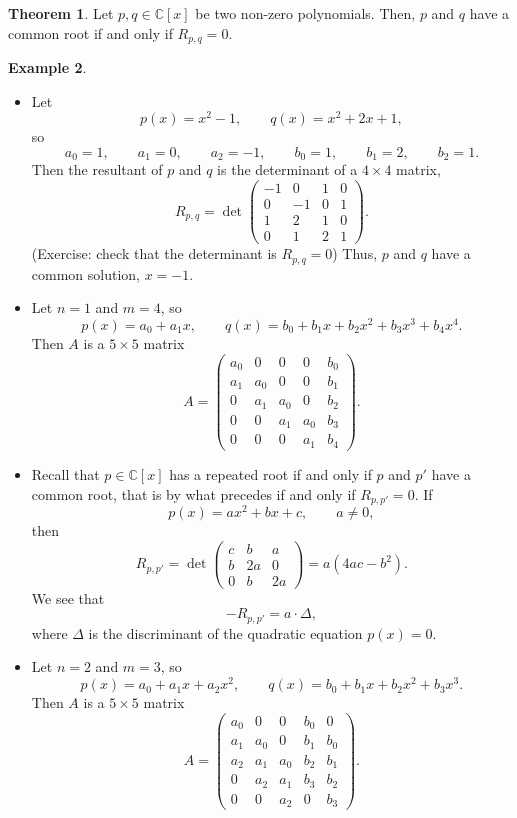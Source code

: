 \documentclass{article}
\newcommand{\C}{\mathbb{C}}
\newcommand{\rb}[1]{\left( #1 \right)}
\renewcommand{\sb}[1]{\left[ #1 \right]}
\theoremstyle{definition}\newtheorem{definition}{Definition}[section]
\theoremstyle{definition}\newtheorem{notation}[definition]{Notation}
\theoremstyle{definition}\newtheorem{remark}[definition]{Remark}
\theoremstyle{definition}\newtheorem{example1}[definition]{Example}
\theoremstyle{definition}\newtheorem{fact}{Fact}
\theoremstyle{definition}\newtheorem{exercise}{Exercise}
\theoremstyle{definition}\newtheorem*{example2}{Example}
\newtheorem{theorem}[definition]{Theorem}
\begin{document}
\begin{theorem}
\label{thm:9.3}
Let $ p, q \in \C\sb{x} $ be two non-zero polynomials. Then, $ p $ and $ q $ have a common root if and only if $ R_{p, q} = 0 $.
\end{theorem}

\begin{example1}
\hfill
\begin{itemize}
\item Let
$$ p\rb{x} = x^2 - 1, \qquad q\rb{x} = x^2 + 2x + 1, $$
so
$$ a_0 = 1, \qquad a_1 = 0, \qquad a_2 = -1, \qquad b_0 = 1, \qquad b_1 = 2, \qquad b_2 = 1. $$
Then the resultant of $ p $ and $ q $ is the determinant of a $ 4 \times 4 $ matrix,
$$ R_{p, q} = \det\begin{pmatrix}
-1 & 0 & 1 & 0 \\
0 & -1 & 0 & 1 \\
1 & 2 & 1 & 0 \\
0 & 1 & 2 & 1
\end{pmatrix}. $$
(Exercise: check that the determinant is $ R_{p, q} = 0 $) Thus, $ p $ and $ q $ have a common solution, $ x = -1 $.
\item Let $ n = 1 $ and $ m = 4 $, so
$$ p\rb{x} = a_0 + a_1x, \qquad q\rb{x} = b_0 + b_1x + b_2x^2 + b_3x^3 + b_4x^4. $$
Then $ A $ is a $ 5 \times 5 $ matrix
$$ A = \begin{pmatrix}
a_0 & 0 & 0 & 0 & b_0 \\
a_1 & a_0 & 0 & 0 & b_1 \\
0 & a_1 & a_0 & 0 & b_2 \\
0 & 0 & a_1 & a_0 & b_3 \\
0 & 0 & 0 & a_1 & b_4
\end{pmatrix}. $$
\item Recall that $ p \in \C\sb{x} $ has a repeated root if and only if $ p $ and $ p' $ have a common root, that is by what precedes if and only if $ R_{p, p'} = 0 $. If
$$ p\rb{x} = ax^2 + bx + c, \qquad a \ne 0, $$
then
$$ R_{p, p'} = \det\begin{pmatrix}
c & b & a \\
b & 2a & 0 \\
0 & b & 2a
\end{pmatrix} = a\rb{4ac - b^2}. $$
We see that
$$ -R_{p, p'} = a \cdot \Delta, $$
where $ \Delta $ is the discriminant of the quadratic equation $ p\rb{x} = 0 $.
\item Let $ n = 2 $ and $ m = 3 $, so
$$ p\rb{x} = a_0 + a_1x + a_2x^2, \qquad q\rb{x} = b_0 + b_1x + b_2x^2 + b_3x^3. $$
Then $ A $ is a $ 5 \times 5 $ matrix
$$ A = \begin{pmatrix}
a_0 & 0 & 0 & b_0 & 0 \\
a_1 & a_0 & 0 & b_1 & b_0 \\
a_2 & a_1 & a_0 & b_2 & b_1 \\
0 & a_2 & a_1 & b_3 & b_2 \\
0 & 0 & a_2 & 0 & b_3
\end{pmatrix}. $$
\end{itemize}
\end{example1}
\end{document}

